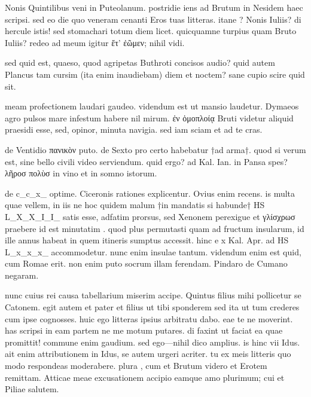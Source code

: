 


 Nonis Quintilibus veni in Puteolanum. postridie iens ad Brutum in Nesidem haec scripsi. sed eo die quo veneram cenanti Eros tuas litteras. itane ? Nonis Iuliis? di hercule istis! sed stomachari totum diem licet. quicquamne turpius quam Bruto Iuliis? redeo ad meum igitur ἔτ' ἐῶμεν; nihil vidi.

 sed quid est, quaeso, quod agripetas Buthroti concisos audio? quid autem Plancus tam cursim (ita enim inaudiebam) diem et noctem? sane cupio scire quid sit.

 meam profectionem laudari gaudeo. videndum est ut mansio laudetur. Dymaeos agro pulsos mare infestum habere nil mirum. ἐν ὁμοπλοίᾳ Bruti videtur aliquid praesidi esse, sed, opinor, minuta navigia. sed iam sciam et ad te cras.

 de Ventidio πανικὸν puto. de Sexto pro certo habebatur †ad arma†. quod si verum est, sine bello civili video serviendum. quid ergo? ad Kal. Ian. in Pansa spes? λῆροσ πολὺσ in vino et in somno istorum.

 de c_c_x_ optime. Ciceronis rationes explicentur. Ovius enim recens. is multa quae vellem, in iis ne hoc quidem malum †in mandatis si habunde† HS L_X_X_I_I_ satis esse, adfatim prorsus, sed Xenonem perexigue et γλίσχρωσ praebere id est minutatim . quod plus permutasti quam ad fructum insularum, id ille annus habeat in quem itineris sumptus accessit. hinc e x Kal. Apr. ad HS L_x_x_x_ accommodetur. nunc enim insulae tantum. videndum enim est quid, cum Romae erit. non enim puto socrum illam ferendam. Pindaro de Cumano negaram.

 nunc cuius rei causa tabellarium miserim accipe. Quintus filius mihi pollicetur se Catonem. egit autem et pater et filius ut tibi sponderem sed ita ut tum crederes cum ipse cognosses. huic ego litteras ipsius arbitratu dabo. eae te ne moverint. has scripsi in eam partem ne me motum putares. di faxint ut faciat ea quae promittit! commune enim gaudium. sed ego—nihil dico amplius. is hinc vii Idus. ait enim attributionem in Idus, se autem urgeri acriter. tu ex meis litteris quo modo respondeas moderabere. plura , cum et Brutum videro et Erotem remittam. Atticae meae excusationem accipio eamque amo plurimum; cui et Piliae salutem.
